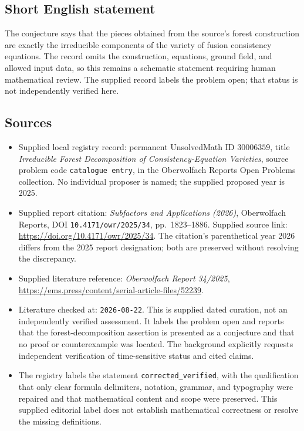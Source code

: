 \documentclass[11pt]{article}
\begin{document}
\subsection{Short English statement}
The conjecture says that the pieces obtained from the source's forest construction are exactly the irreducible components of the variety of fusion consistency equations. The record omits the construction, equations, ground field, and allowed input data, so this remains a schematic statement requiring human mathematical review. The supplied record labels the problem open; that status is not independently verified here.
\subsection{Sources}
\begin{itemize}
\item Supplied local registry record: permanent UnsolvedMath ID \(30006359\), title \emph{Irreducible Forest Decomposition of Consistency-Equation Varieties}, source problem code \texttt{catalogue entry}, in the Oberwolfach Reports Open Problems collection. No individual proposer is named; the supplied proposed year is 2025.
\item Supplied report citation: \emph{Subfactors and Applications (2026)}, Oberwolfach Reports, DOI \texttt{10.4171/owr/2025/34}, pp.\ 1823--1886. Supplied source link: \url{https://doi.org/10.4171/owr/2025/34}. The citation's parenthetical year 2026 differs from the 2025 report designation; both are preserved without resolving the discrepancy.
\item Supplied literature reference: \emph{Oberwolfach Report 34/2025}, \url{https://ems.press/content/serial-article-files/52239}.
\item Literature checked at: \texttt{2026-08-22}. This is supplied dated curation, not an independently verified assessment. It labels the problem open and reports that the forest-decomposition assertion is presented as a conjecture and that no proof or counterexample was located. The background explicitly requests independent verification of time-sensitive status and cited claims.
\item The registry labels the statement \texttt{corrected\_verified}, with the qualification that only clear formula delimiters, notation, grammar, and typography were repaired and that mathematical content and scope were preserved. This supplied editorial label does not establish mathematical correctness or resolve the missing definitions.
\end{itemize}
\end{document}
